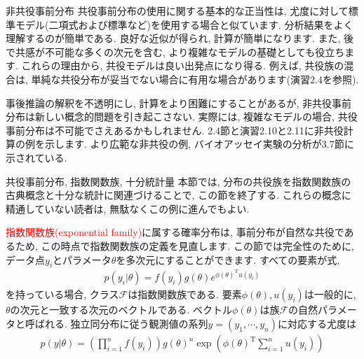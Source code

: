 \documentclass[10pt,dvipdfmx,a4]{beamer}
\newcommand{\eqn}[1]{\begin{align*}#1\end{align*}}
\newcommand{\tcr}[1]{\textcolor{red}{#1}}
\begin{document}

\begin{frame}{非共役事前分布}
共役事前分布の使用に関する基本的な正当性は, 尤度に対して標準モデル(二項式および標準など)を使用する場合と似ています.
分析結果をよく理解するのが簡単である.
良好な近似が得られ, 計算が簡単になります.
また, 後で共感が不可能な多くの次元を含む, より複雑なモデルの基礎としても役立ちます.
これらの理由から, 共役モデルは良い出発点になり得る.
例えば, 共役族の混合は, 単純な共役分布が妥当でない場合に有用な場合があります(演習2.4を参照).

事後推論の解釈を不透明にし, 計算をより困難にすることがあるが, 非共役事前分布は新しい概念的問題を引き起こさない.
実際には, 複雑なモデルの場合, 共役事前分布は不可能でさえあるかもしれません.
2.4節と演習2.10と2.11に非共役計算の例を示します.
より広範な非共役の例, バイオアッセイ実験の分析が3.7節に示されている.
\end{frame}


\begin{frame}{共役事前分布, 指数関数族, 十分統計量}
本節では, 分布の共役族を指数関数族の古典概念と十分な統計に関連づけることで, この節を終了する.
これらの概念に精通していない読者は, 無駄なくこの例に進んでもよい.

\tcr{指数関数族(exponential family)}に属する確率分布は, 事前分布が自然な共役であるため, この時点で指数関数族の定義を見直します.
この節では完全性のために, データ点$y_i$とパラメータ$\theta$を多次元にすることができます.
すべての要素が式,
\eqn{p(y_i|\theta)=f(y_i)g(\theta)e^{\phi(\theta)^{\mathrm{T}}u(y_i)}}
を持っている場合, クラス$\mathcal{F}$は指数関数族である.
要素$\phi(\theta), u(y_i)$は一般的に, $\theta$の次元と一致する次元のベクトルである.
ベクトル$\phi(\theta)$は族$\mathcal{F}$の自然パラメータと呼ばれる.
独立同分布に従う観測値の系列$y=(y_1,\cdots,y_n)$に対応する尤度は
\eqn{p(y|\theta)=\left(\prod_{i=1}^n f(y_i)\right) g(\theta)^n \exp \left( \phi(\theta)^{\mathrm{T}}\sum_{i=1}^n u(y_i)\right)}
\end{frame}

\end{document}
